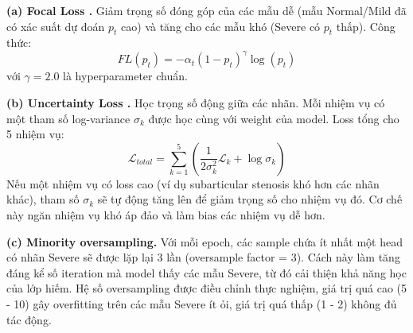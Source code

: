 \textbf{(a) Focal Loss \cite{lin2017focal}.} Giảm trọng số đóng góp của các mẫu dễ (mẫu Normal/Mild đã có xác suất dự đoán $p_t$ cao) và tăng cho các mẫu khó (Severe có $p_t$ thấp). Công thức:
\begin{equation}
    FL(p_t) = -\alpha_t (1 - p_t)^\gamma \log(p_t)
\end{equation}
với $\gamma = 2.0$ là hyperparameter chuẩn. 

\textbf{(b) Uncertainty Loss \cite{kendall2018multitask}.} Học trọng số động giữa các nhãn. Mỗi nhiệm vụ có một tham số log-variance $\sigma_k$ được học cùng với weight của model. Loss tổng cho 5 nhiệm vụ:
\begin{equation}
    \mathcal{L}_{total} = \sum_{k=1}^{5} \left( \frac{1}{2 \sigma_k^2} \mathcal{L}_k + \log \sigma_k \right)
\end{equation}
Nếu một nhiệm vụ có loss cao (ví dụ subarticular stenosis khó hơn các nhãn khác), tham số $\sigma_k$ sẽ tự động tăng lên để giảm trọng số cho nhiệm vụ đó. Cơ chế này ngăn nhiệm vụ khó áp đảo và làm bias các nhiệm vụ dễ hơn.

\textbf{(c) Minority oversampling.} Với mỗi epoch, các sample chứa ít nhất một head có nhãn Severe sẽ được lặp lại 3 lần (oversample factor = 3). Cách này làm tăng đáng kể số iteration mà model thấy các mẫu Severe, từ đó cải thiện khả năng học của lớp hiếm. Hệ số oversampling được điều chỉnh thực nghiệm, giá trị quá cao (5 - 10) gây overfitting trên các mẫu Severe ít ỏi, giá trị quá thấp (1 - 2) không đủ tác động.\\

